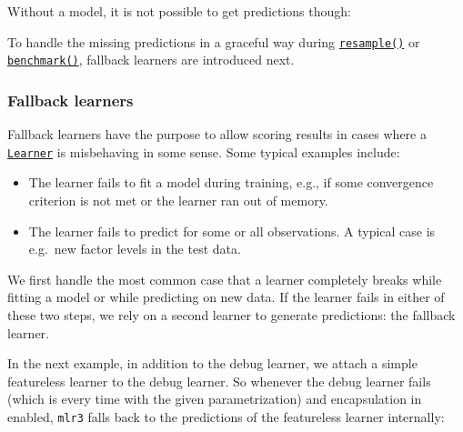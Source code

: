 \documentclass[]{article}
\newenvironment{Shaded}{}{}
\newcommand{\KeywordTok}[1]{\textcolor[rgb]{0.00,0.00,1.00}{#1}}
\newcommand{\NormalTok}[1]{#1}
\newcommand{\OperatorTok}[1]{#1}
\providecommand{\tightlist}{%
  \setlength{\itemsep}{0pt}\setlength{\parskip}{0pt}}
\renewenvironment{Shaded} {\begin{snugshade}\small} {\end{snugshade}}
\begin{document}
Without a model, it is not possible to get predictions though:

\begin{Shaded}
\end{Shaded}

To handle the missing predictions in a graceful way during \href{https://mlr3.mlr-org.com/reference/resample.html}{\texttt{resample()}} or \href{https://mlr3.mlr-org.com/reference/benchmark.html}{\texttt{benchmark()}}, fallback learners are introduced next.

\hypertarget{fallback-learners}{%
\subsubsection{Fallback learners}\label{fallback-learners}}

Fallback learners have the purpose to allow scoring results in cases where a \href{https://mlr3.mlr-org.com/reference/Learner.html}{\texttt{Learner}} is misbehaving in some sense.
Some typical examples include:

\begin{itemize}
\tightlist
\item
  The learner fails to fit a model during training, e.g., if some convergence criterion is not met or the learner ran out of memory.
\item
  The learner fails to predict for some or all observations.
  A typical case is e.g.~new factor levels in the test data.
\end{itemize}

We first handle the most common case that a learner completely breaks while fitting a model or while predicting on new data.
If the learner fails in either of these two steps, we rely on a second learner to generate predictions: the fallback learner.

In the next example, in addition to the debug learner, we attach a simple featureless learner to the debug learner.
So whenever the debug learner fails (which is every time with the given parametrization) and encapsulation in enabled, \texttt{mlr3} falls back to the predictions of the featureless learner internally:
\end{document}
